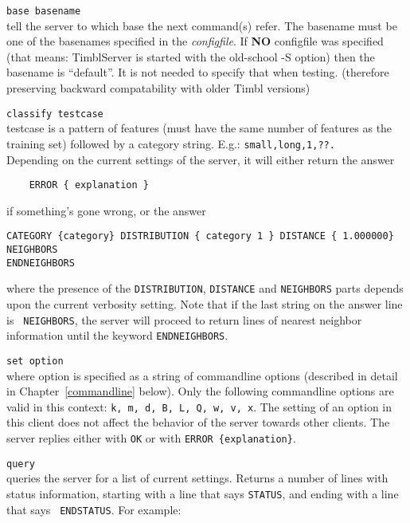 \documentclass{report}
\begin{document}
\begin{description}
\item {\tt base basename}\\
  tell the server to which base the next command(s) refer. The
  basename must be one of the basenames specified in the {\em
    configfile}.  If {\bf NO} configfile was specified (that means:
  TimblServer is started with the old-school -S option) then the
  basename is ``default''. It is not needed to specify that when
  testing. (therefore preserving backward compatability with older
  Timbl versions)

\item {\tt classify testcase}\\
  testcase is a pattern of features (must have the same number of
  features as the training set) followed by a category
  string. E.g.: {\tt small,long,1,??.}\\
  Depending on the current settings of the server, it will either
  return the answer
      \begin{verbatim}
	ERROR { explanation }
      \end{verbatim}
      if something's gone wrong, or the answer
      \begin{verbatim}
CATEGORY {category} DISTRIBUTION { category 1 } DISTANCE { 1.000000} NEIGHBORS
ENDNEIGHBORS
      \end{verbatim}
      where the presence of the {\tt DISTRIBUTION}, {\tt DISTANCE} and
      {\tt NEIGHBORS} parts depends upon the current verbosity
      setting. Note that if the last string on the answer line is {\tt
        NEIGHBORS}, the server will proceed to return lines of nearest
      neighbor information until the keyword {\tt ENDNEIGHBORS}.
\item {\tt set option}\\ where option is specified as a string of
      commandline options (described in detail in
      Chapter~\ref{commandline} below). Only the following commandline
      options are valid in this context: {\tt k, m, d, B, L, Q, w, v,
      x}. The setting of an option in this client does not affect the
      behavior of the server towards other clients. The server replies
      either with {\tt OK} or with {\tt ERROR \{explanation\}}.
    \item {\tt query}\\
      queries the server for a list of current settings. Returns a
      number of lines with status information, starting with a line
      that says {\tt STATUS}, and ending with a line that says {\tt
        ENDSTATUS}. For example:


\end{description}
\end{document}
